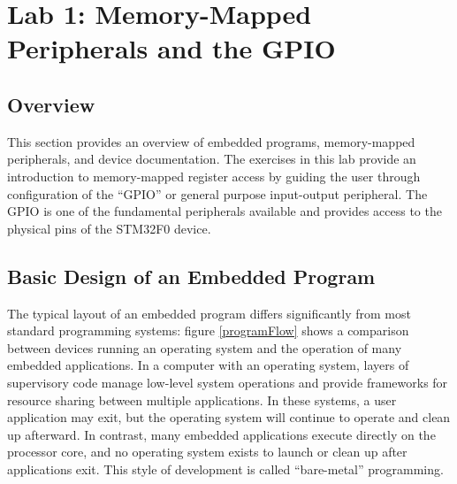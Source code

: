 \documentclass[openany,11pt,fleqn]{book} %
\begin{document}


\chapter{Lab 1: Memory-Mapped Peripherals and the GPIO}

\section{Overview}
This section provides an overview of embedded programs, memory-mapped peripherals, and device documentation. The exercises in this lab provide an introduction to memory-mapped register access by guiding the user through configuration of the ``GPIO'' or general purpose input-output peripheral. The GPIO is one of the fundamental peripherals available and provides access to the physical pins of the STM32F0 device. 


\section{\color{orange}Basic Design of an Embedded Program}


The typical layout of an embedded program differs significantly from most standard programming systems: figure \ref{programFlow} shows a comparison between devices running an operating system and the operation of many embedded applications. 
In a computer with an operating system, layers of supervisory code manage low-level system operations and provide frameworks for resource sharing between multiple applications. In these systems, a user application may exit, but the operating system will continue to operate and clean up afterward. In contrast, many embedded applications execute directly on the processor core, and no operating system exists to launch or clean up after applications exit. This style of development is called ``bare-metal'' programming. 
\end{document}

